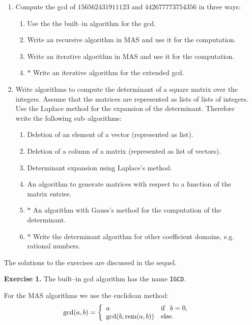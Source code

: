 \begin{enumerate}
\item Compute the gcd of $156562431911123$ and 
      $442677773754356$ in three ways:
      \begin{enumerate}
      \item Use the the built--in algorithm for the gcd.
      \item Write an recursive algorithm in MAS and
            use it for the computation.
      \item Write an iterative algorithm in MAS and
            use it for the computation.
      \item $*$ Write an iterative algorithm for the 
            extended gcd.
      \end{enumerate}
\item Write algorithms to compute the determinant of 
      a square matrix over the integers. 
      Assume that the matrices are represented as lists of lists
      of integers. Use the Laplace method for the expansion 
      of the determinant.
      Therefore write the following sub--algorithms: 
      \begin{enumerate}
      \item Deletion of an element of a vector (represented as list).
      \item Deletion of a column of a matrix (represented 
            as list of vectors).
      \item Determinant expansion using Laplace's method.
      \item An algorithm to generate matrices with
            respect to a function of the matrix entries.
      \item $*$ An algorithm with Gauss's method for the 
            computation of the determinant.
      \item $*$ Write the determinant algorithm for other
            coefficient domains, e.g. rational numbers.
      \end{enumerate}
\end{enumerate}

The solutions to the exercises are discussed in the sequel.

{\bf Exercise 1.} 
The built--in gcd algorithm has the name \verb/IGCD/.

For the MAS algorithms we use the euclidean method:
\begin{displaymath}
      {\rm gcd}(a,b) = \left\{
                       \begin{array}{ll}
                              a & {\rm if} \ \  b = 0, \\
  {\rm gcd}(b, {\rm rem}(a,b) ) & {\rm else}.
                       \end{array}
                       \right.
\end{displaymath}

